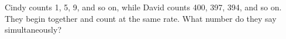 Cindy counts 1, 5, 9, and so on, while David counts 400, 397, 394, and so on. They begin together and count at the same rate. What number do they say simultaneously?
